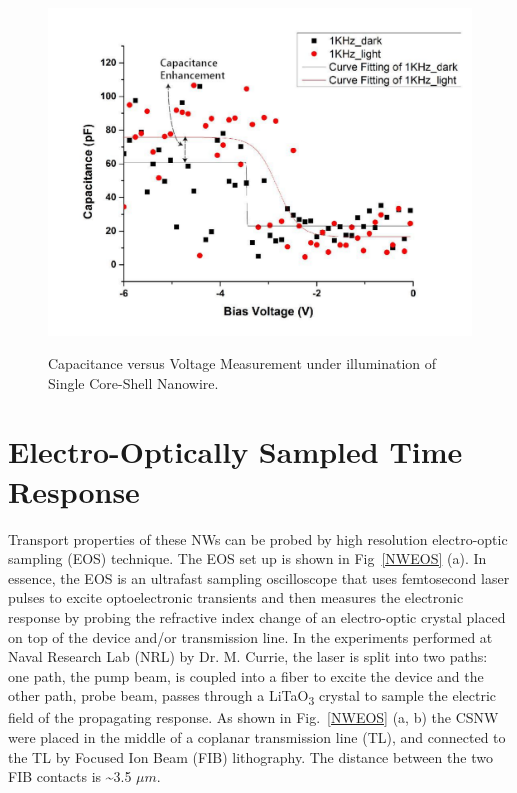 \begin{figure}
  \caption{Capacitance versus Voltage Measurement under illumination of Single Core-Shell Nanowire.}
  \centering
  \includegraphics[width=\textwidth]{pictures/Data/CSNWCVlight}
  \label{CSNWCVlight}
\end{figure}

\section{Electro-Optically Sampled Time Response}

Transport properties of these NWs can be probed by high resolution
electro-optic sampling (EOS) technique.  The EOS set up is shown in
Fig~\ref{NWEOS} (a). In essence, the EOS is an ultrafast sampling oscilloscope
that uses femtosecond laser pulses to excite optoelectronic transients and then
measures the electronic response by probing the refractive index change of an
electro-optic crystal placed on top of the device and/or transmission line. In
the experiments performed at Naval Research Lab (NRL) by Dr. M. Currie, the
laser is split into two paths: one path, the pump beam, is coupled into a fiber
to excite the device and the other path, probe beam, passes through a
LiTaO\textsubscript{3} crystal to sample the electric field of the propagating
response. As shown in Fig.~\ref{NWEOS} (a, b) the CSNW were placed in the
middle of a coplanar transmission line (TL), and connected to the TL by Focused
Ion Beam (FIB) lithography. The distance between the two FIB contacts is
\textasciitilde{}3.5 $\mu{m}$.

